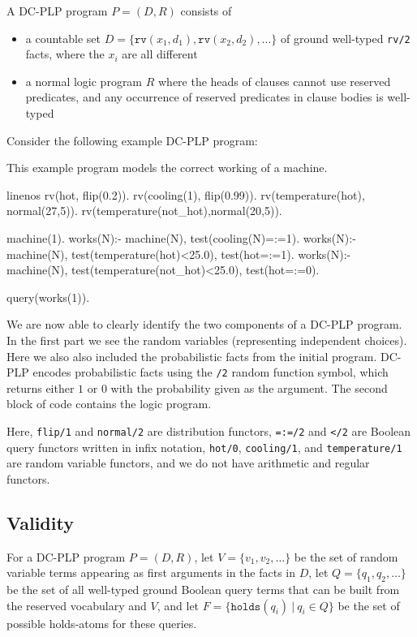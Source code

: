 A DC-PLP program $P=(D,R)$ consists of
\begin{itemize}
    \item a countable set $D=\{\mathtt{rv}(x_1,d_1),\mathtt{rv}(x_2,d_2),\ldots\}$ of ground well-typed \verb|rv/2| facts,  where the $x_i$ are all different 
    \item a normal logic program $R$ where the heads of clauses cannot use reserved predicates, and any occurrence of reserved predicates in clause bodies is well-typed
\end{itemize}

Consider the following example DC-PLP program:
\begin{example} \label{ex:dcproblog_program_without_dc_plpdc}
	This example program models the correct working of a machine.
	
\begin{problog*}{linenos}
rv(hot, flip(0.2)). 
rv(cooling(1), flip(0.99)). 
rv(temperature(hot), normal(27,5)).
rv(temperature(not_hot),normal(20,5)).

machine(1).
works(N):- machine(N), test(cooling(N)=:=1).
works(N):-
	machine(N),
	test(temperature(hot)<25.0),
	test(hot=:=1). 
works(N):-
	machine(N),
	test(temperature(not_hot)<25.0),
	test(hot=:=0). 

query(works(1)).
\end{problog*}
	We are now able to clearly identify the two components of a DC-PLP program. In the first part we see the random variables (representing independent choices). Here we also also included the probabilistic facts from the initial \dcproblogsty program. DC-PLP encodes probabilistic facts using the \lstinline[columns=fixed]|/2| random function symbol, which returns either $1$ or $0$ with the probability given as the argument. The second block of code  contains the logic program.
\end{example}

Here, \verb|flip/1| and \verb|normal/2| are distribution functors, \verb|=:=/2| and \verb|</2| are Boolean query functors written in infix notation, \verb|hot/0|, \verb|cooling/1|, and \verb|temperature/1| are random variable functors, and we do not have  arithmetic and regular functors.  

\subsection{Validity}\label{sec:dcplpvalidity}
For a DC-PLP program $P=(D,R)$, let $V=\{v_1,v_2,\ldots\}$  be the set of  random variable terms appearing as first arguments in the facts in $D$, 
let $Q=\{q_1,q_2,\ldots\}$ be the set of all well-typed ground Boolean query terms  that can be built from the reserved vocabulary and $V$, and let $F=\{\mathtt{holds}(q_i)~|~q_i\in Q\}$ be the set of possible holds-atoms for these queries.

